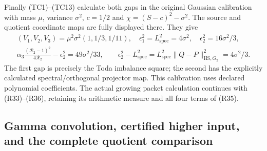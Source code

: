 Finally (TC1)--(TC13) calculate both gaps in the original Gaussian
calibration with mass $\mu$, variance $\sigma^2$, $c=1/2$ and
$\chi=(S-c)^2-\sigma^2$. The source and quotient coordinate maps are
fully displayed there. They give
\[
\begin{gathered}
 (V_1,V_2,V_3)=\mu^2\sigma^2(1,1/3,1/11),\quad
 \epsilon_1^2=L_{\mathrm{spec}}^2=4\sigma^2,\quad
 \epsilon_2^2=16\sigma^2/3,\\
 \alpha_3\frac{(\mathcal R_2-1)^2}{4\mathcal R_2}-\epsilon_2^2
 =49\sigma^2/33,\qquad
 \epsilon_2^2-L_{\mathrm{spec}}^2
 =L_{\mathrm{spec}}^2\|Q-P\|_{\mathrm{HS},G_2}^2=4\sigma^2/3.
\end{gathered}
\tag{R37}
\]
The first gap is precisely the Toda imbalance square; the second has
the explicitly calculated spectral/orthogonal projector map. This
calibration uses declared polynomial coefficients. The actual growing
packet calculation continues with (R33)--(R36), retaining its arithmetic
measure and all four terms of (R35).


\subsection{Gamma convolution, certified higher input, and the complete quotient comparison}

